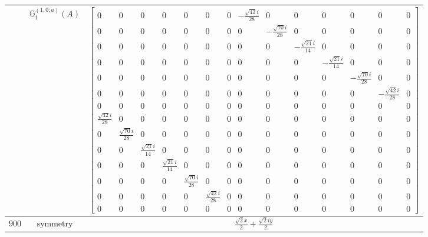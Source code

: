 \documentclass[fleqn,8pt,landscape]{jsarticle}
\begin{document}
\begin{longtable}{ccc}
$  $ & $ \mathbb{G}_{1}^{(1,0;a)}(A) $ & $ \begin{bmatrix} 0 & 0 & 0 & 0 & 0 & 0 & 0 & - \frac{\sqrt{42} i}{28} & 0 & 0 & 0 & 0 & 0 & 0 \\ 0 & 0 & 0 & 0 & 0 & 0 & 0 & 0 & - \frac{\sqrt{70} i}{28} & 0 & 0 & 0 & 0 & 0 \\ 0 & 0 & 0 & 0 & 0 & 0 & 0 & 0 & 0 & - \frac{\sqrt{21} i}{14} & 0 & 0 & 0 & 0 \\ 0 & 0 & 0 & 0 & 0 & 0 & 0 & 0 & 0 & 0 & - \frac{\sqrt{21} i}{14} & 0 & 0 & 0 \\ 0 & 0 & 0 & 0 & 0 & 0 & 0 & 0 & 0 & 0 & 0 & - \frac{\sqrt{70} i}{28} & 0 & 0 \\ 0 & 0 & 0 & 0 & 0 & 0 & 0 & 0 & 0 & 0 & 0 & 0 & - \frac{\sqrt{42} i}{28} & 0 \\ 0 & 0 & 0 & 0 & 0 & 0 & 0 & 0 & 0 & 0 & 0 & 0 & 0 & 0 \\ \frac{\sqrt{42} i}{28} & 0 & 0 & 0 & 0 & 0 & 0 & 0 & 0 & 0 & 0 & 0 & 0 & 0 \\ 0 & \frac{\sqrt{70} i}{28} & 0 & 0 & 0 & 0 & 0 & 0 & 0 & 0 & 0 & 0 & 0 & 0 \\ 0 & 0 & \frac{\sqrt{21} i}{14} & 0 & 0 & 0 & 0 & 0 & 0 & 0 & 0 & 0 & 0 & 0 \\ 0 & 0 & 0 & \frac{\sqrt{21} i}{14} & 0 & 0 & 0 & 0 & 0 & 0 & 0 & 0 & 0 & 0 \\ 0 & 0 & 0 & 0 & \frac{\sqrt{70} i}{28} & 0 & 0 & 0 & 0 & 0 & 0 & 0 & 0 & 0 \\ 0 & 0 & 0 & 0 & 0 & \frac{\sqrt{42} i}{28} & 0 & 0 & 0 & 0 & 0 & 0 & 0 & 0 \\ 0 & 0 & 0 & 0 & 0 & 0 & 0 & 0 & 0 & 0 & 0 & 0 & 0 & 0 \end{bmatrix} $ \\ \hline
$ 900 $ & $ \text{symmetry} $ & $ \frac{\sqrt{2} x}{2} + \frac{\sqrt{2} i y}{2} $ \\

\end{longtable}
\end{document}
